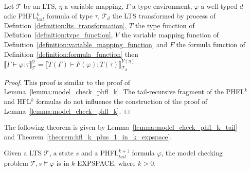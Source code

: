 \begin{lemma}
    \label{lemma:model_check_phfl_k_tail}
    Let $\mathcal{T}$ be an LTS, $\eta$ a variable mapping, $\Gamma$ a type environment, $\varphi$ a well-typed $d$-adic
    PHFL$^k_{tail}$ formula of type $\tau$, $\mathcal{T}_d$ the LTS transformed by process of
    Defintion~\ref{definition:lts_transformation}, $T$ the type function of Defintion~\ref{definition:type_function},
    $V$ the variable mapping function of Definition~\ref{definition:variable_mapping_function}
    and $F$ the formula function of Definition~\ref{definition:formula_function} then $\llbracket \Gamma \vdash
    \varphi \colon \tau \rrbracket^\eta_\mathcal{T} = \llbracket T(\Gamma) \vdash F(\varphi) \colon T(\tau)
    \rrbracket^{V(\eta)}_{\mathcal{T}_d}$
\end{lemma}

\begin{proof}
    This proof is similar to the proof of Lemma~\ref{lemma:model_check_phfl_k}. The tail-recursive fragment of the
    PHFL$^k$ and HFL$^k$ formulas do not influence the construction of the proof of
    Lemma~\ref{lemma:model_check_phfl_k}.
\end{proof}

The following theorem is given by Lemma~\ref{lemma:model_check_phfl_k_tail} and
Theorem~\ref{theorem:hfl_k_plus_1_in_k_expspace}.

\begin{theorem}
    \label{theorem:phfl_k_plus_1_tail_in_k_expspace}
    Given a LTS $\mathcal{T}$, a state $s$ and a PHFL$^{k + 1}_{tail}$ formula $\varphi$, the model checking problem
    $\mathcal{T}, s \models \varphi$ is in $k$-EXPSPACE, where $k > 0$.
\end{theorem}